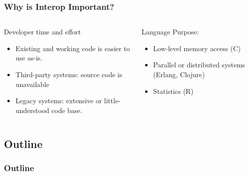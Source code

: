 \documentclass{beamer}
\begin{document}
\begin{frame}
  \frametitle{Why is Interop Important?}
  
  \begin{columns}[t]
  \begin{column}{0.5\textwidth}
  Developer time and effort
  \begin{itemize}
	\item Existing and working code is easier to use as-is.
  	\item Third-party systems: source code is unavailable
	\item Legacy systems: extensive or little-understood code base.
  \end{itemize}
  \end{column}

  \begin{column}{0.5\textwidth}
  Language Purpose:
  \begin{itemize}
  	\item Low-level memory access (C)
  	\item Parallel or distributed systems (Erlang, Clojure)
  	\item Statistics (R)
  \end{itemize}
  \end{column}
  \end{columns}
%

  
\end{frame}

\subsection*{Outline}

\begin{frame}
  \frametitle{Outline}
  \tableofcontents[hideallsubsections]
\end{frame}
\end{document}
